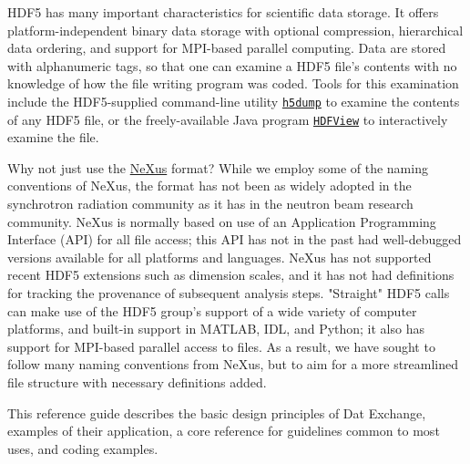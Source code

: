 \documentclass[usletter,11pt]{article}
\begin{document}
HDF5 has many important characteristics for scientific data storage.
It offers platform-independent binary data storage with optional compression, 
hierarchical data ordering, and support for MPI-based parallel computing.
Data are stored with alphanumeric tags, so that one can examine a 
HDF5 file's contents with no knowledge of how the file writing program 
was coded. Tools for this examination include the 
HDF5-supplied command-line utility 
\href{http://www.hdfgroup.org/HDF5/doc/RM/Tools.html#Tools-Dump}{\texttt{h5dump}} 
to examine the contents of any HDF5 file, or the freely-available Java program 
\href{http://www.hdfgroup.org/hdf-java-html/hdfview/}{\texttt{HDFView}} to interactively examine the file.

Why not just use the \href{http://www.nexusformat.org/}{NeXus} format? While we employ some of the naming conventions of NeXus, the format has not been as widely adopted in the synchrotron radiation community as it has in the neutron beam research community.  NeXus is normally based on use of an Application Programming Interface (API) for all file access; this API has not in the past had well-debugged versions available for all platforms and languages.  NeXus has not supported recent HDF5 extensions such as dimension scales, and it has not had definitions for tracking the provenance of subsequent analysis steps.  "Straight" HDF5 calls can make use of the HDF5 group's support of a wide variety of computer platforms, and built-in support in MATLAB, IDL, and Python; it also has support for MPI-based parallel access to files.  As a result, we have sought to follow many naming conventions from NeXus, but to aim for a more streamlined file structure with necessary definitions added.

This reference guide describes the basic design principles of Dat Exchange, examples of their
application, a core reference for guidelines common to most uses, and coding
examples.



\newpage



\newpage




%

\newpage


\end{document}
